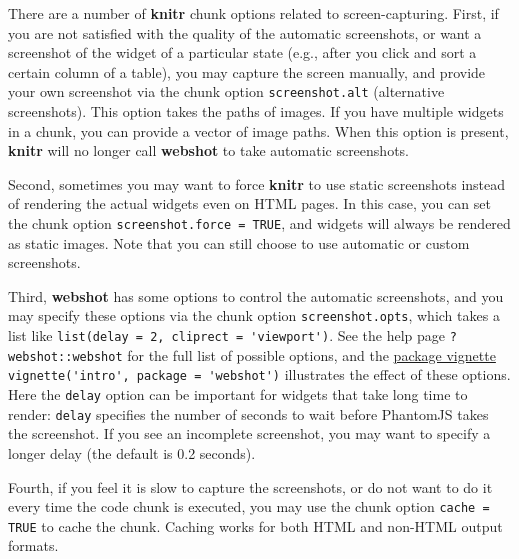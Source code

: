 \documentclass[doctor,openright,twoside]{sjtuthesis}
\newcommand{\passthrough}[1]{#1}
\theoremstyle{plain}
\theoremstyle{definition}
\theoremstyle{remark}
\theoremstyle{ocrenumbox}
\theoremstyle{plain}
\begin{document}
There are a number of \textbf{knitr} chunk options related to screen-capturing. First, if you are not satisfied with the quality of the automatic screenshots, or want a screenshot of the widget of a particular state (e.g., after you click and sort a certain column of a table), you may capture the screen manually, and provide your own screenshot via the chunk option \passthrough{\lstinline!screenshot.alt!} (alternative screenshots). This option takes the paths of images. If you have multiple widgets in a chunk, you can provide a vector of image paths. When this option is present, \textbf{knitr} will no longer call \textbf{webshot} to take automatic screenshots.

Second, sometimes you may want to force \textbf{knitr} to use static screenshots instead of rendering the actual widgets even on HTML pages. In this case, you can set the chunk option \passthrough{\lstinline!screenshot.force = TRUE!}, and widgets will always be rendered as static images. Note that you can still choose to use automatic or custom screenshots.

Third, \textbf{webshot} has some options to control the automatic screenshots, and you may specify these options via the chunk option \passthrough{\lstinline!screenshot.opts!}, which takes a list like \passthrough{\lstinline!list(delay = 2, cliprect = 'viewport')!}. See the help page \passthrough{\lstinline!?webshot::webshot!} for the full list of possible options, and the \href{https://cran.rstudio.com/web/packages/webshot/vignettes/intro.html}{package vignette} \passthrough{\lstinline!vignette('intro', package = 'webshot')!} illustrates the effect of these options. Here the \passthrough{\lstinline!delay!} option can be important for widgets that take long time to render: \passthrough{\lstinline!delay!} specifies the number of seconds to wait before PhantomJS takes the screenshot. If you see an incomplete screenshot, you may want to specify a longer delay (the default is 0.2 seconds).

Fourth, if you feel it is slow to capture the screenshots, or do not want to do it every time the code chunk is executed, you may use the chunk option \passthrough{\lstinline!cache = TRUE!} to cache the chunk. Caching works for both HTML and non-HTML output formats.
\end{document}
